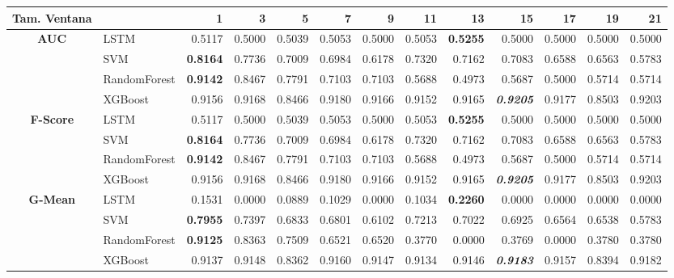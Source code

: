 \begin{table}[H]
	\centering
	\begin{adjustbox}{max width=12cm}
		\begin{tabular}{|c|l|r|r|r|r|r|r|r|r|r|r|r|}
			\hline
			\textbf{Tam. Ventana} &         &      1  &      3  &      5  &      7  &      9  &      11 &      13 &      15 &      17 &      19 &      21 \\
			\hline
			\textbf{AUC} &  LSTM &  0.5117 &  0.5000 &  0.5039 &  0.5053 &  0.5000 &  0.5053 & \textbf{  0.5255 } &  0.5000 &  0.5000 &  0.5000 &  0.5000 \\
			&  SVM & \textbf{  0.8164 } &  0.7736 &  0.7009 &  0.6984 &  0.6178 &  0.7320 &  0.7162 &  0.7083 &  0.6588 &  0.6563 &  0.5783 \\
			&  RandomForest & \textbf{  0.9142 } &  0.8467 &  0.7791 &  0.7103 &  0.7103 &  0.5688 &  0.4973 &  0.5687 &  0.5000 &  0.5714 &  0.5714 \\
			&  XGBoost &  0.9156 &  0.9168 &  0.8466 &  0.9180 &  0.9166 &  0.9152 &  0.9165 & \textit{ \textbf{  0.9205 } } &  0.9177 &  0.8503 &  0.9203 \\
			\hline
			\textbf{F-Score} &  LSTM &  0.5117 &  0.5000 &  0.5039 &  0.5053 &  0.5000 &  0.5053 & \textbf{  0.5255 } &  0.5000 &  0.5000 &  0.5000 &  0.5000 \\
			&  SVM & \textbf{  0.8164 } &  0.7736 &  0.7009 &  0.6984 &  0.6178 &  0.7320 &  0.7162 &  0.7083 &  0.6588 &  0.6563 &  0.5783 \\
			&  RandomForest & \textbf{  0.9142 } &  0.8467 &  0.7791 &  0.7103 &  0.7103 &  0.5688 &  0.4973 &  0.5687 &  0.5000 &  0.5714 &  0.5714 \\
			&  XGBoost &  0.9156 &  0.9168 &  0.8466 &  0.9180 &  0.9166 &  0.9152 &  0.9165 & \textit{ \textbf{  0.9205 } } &  0.9177 &  0.8503 &  0.9203 \\
			\hline
			\textbf{G-Mean} &  LSTM &  0.1531 &  0.0000 &  0.0889 &  0.1029 &  0.0000 &  0.1034 & \textbf{  0.2260 } &  0.0000 &  0.0000 &  0.0000 &  0.0000 \\
			&  SVM & \textbf{  0.7955 } &  0.7397 &  0.6833 &  0.6801 &  0.6102 &  0.7213 &  0.7022 &  0.6925 &  0.6564 &  0.6538 &  0.5783 \\
			&  RandomForest & \textbf{  0.9125 } &  0.8363 &  0.7509 &  0.6521 &  0.6520 &  0.3770 &  0.0000 &  0.3769 &  0.0000 &  0.3780 &  0.3780 \\
			&  XGBoost &  0.9137 &  0.9148 &  0.8362 &  0.9160 &  0.9147 &  0.9134 &  0.9146 & \textit{ \textbf{  0.9183 } } &  0.9157 &  0.8394 &  0.9182 \\

\end{tabular}
\end{adjustbox}
\end{table}
